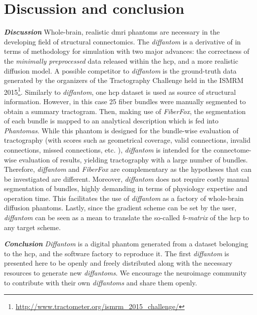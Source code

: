 \documentclass[english]{frontiers/frontiersSCNS} %
\begin{document}
\section*{Discussion and conclusion}

\noindent\textbf{\textit{Discussion\textcolon}}\label{sec:discussion} %
Whole-brain, realistic \gls*{dmri} phantoms are necessary in the developing field of structural
  connectomics.
The \emph{diffantom} is a derivative of \citep{wilkins_fiber_2014} in terms of methodology for
  simulation with two major advances: the correctness of the \emph{minimally preprocessed} data
  \citep{glasser_minimal_2013} released within the \gls*{hcp}, and a more realistic diffusion
  model.
A possible competitor to \emph{diffantom} is the ground-truth data generated by the organizers of the
  Tractography Challenge held in the ISMRM 2015\footnote{\url{http://www.tractometer.org/ismrm_2015_challenge/}}.
Similarly to \emph{diffantom}, one \gls*{hcp} dataset is used as source of structural information.
However, in this case 25 fiber bundles were manually segmented to obtain a summary tractogram.
Then, making use of \emph{FiberFox}, the segmentation of each bundle is mapped to an analytical description
  which is fed into \emph{Phantomas}.
While this phantom is designed for the bundle-wise evaluation of tractography (with scores such as geometrical coverage,
  valid connections, invalid connections, missed connections, etc. \citep{cote_tractometer_2013}),
  \emph{diffantom} is intended for the connectome-wise evaluation of results, yielding tractography with
  a large number of bundles.
Therefore, \emph{diffantom} and \emph{FiberFox} are complementary as the hypotheses that can be investigated are different.
Moreover, \emph{diffantom} does not require costly manual segmentation of bundles, highly demanding in terms of physiology
  expertise and operation time.
This facilitates the use of \emph{diffantom} as a factory of whole-brain diffusion phantoms.
Lastly, since the gradient scheme can be set by the user, \emph{diffantom} can be seen as a mean to translate the so-called
  \emph{b-matrix} of the \gls*{hcp} to any target scheme.

\noindent\textbf{\textit{Conclusion\textcolon}}\label{sec:conclusion} %
\emph{Diffantom} is a digital phantom generated from a dataset belonging to the \acrlong*{hcp}, and the software factory to
  reproduce it.
The first \emph{diffantom} is presented here to be openly and freely distributed along with the necessary resources to
  generate new \emph{diffantoms}.
We encourage the neuroimage community to contribute with their own \emph{diffantoms} and share them openly.
\end{document}
